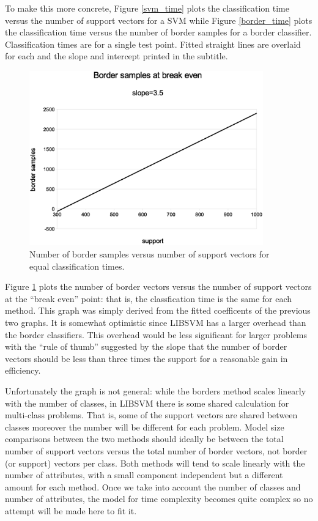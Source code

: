 To make this more concrete, Figure \ref{svm_time}
plots the classification time versus the number of support vectors
for a SVM
while Figure \ref{border_time} plots the classification time
versus the number of border samples for a border classifier.
Classification times are for a single test point.
Fitted straight lines are overlaid for each and the slope and intercept 
printed in the subtitle.

\begin{figure}
\includegraphics[width=0.9\textwidth]{../break_even}
\caption{Number of border samples versus number of support vectors for equal classification times.}
\label{break_even}
\end{figure}

Figure \ref{break_even} plots the number of border vectors versus the number
of support vectors at the ``break even'' point: that is, the classfication
time is the same for each method.
This graph was simply derived from the fitted coefficents of the previous
two graphs.
It is somewhat optimistic
since LIBSVM has a larger overhead than the border classifiers.
This overhead would be less significant for larger problems 
with the ``rule of thumb'' suggested by the slope 
that the number of border vectors should be less than three times the support
for a reasonable gain in efficiency.

Unfortunately the graph is not general: while the borders method scales linearly with
the number of classes, in LIBSVM there is some shared calculation for multi-class problems.
That is, some of the support vectors are shared between classes moreover the number will be different for each problem.
Model size comparisons between the two methods should ideally be between the total 
number of support vectors versus the total number of border vectors, not border (or support) vectors per class.
Both methods will tend to scale linearly with the number of attributes, with a small
component independent but a different amount for each method.
Once we take into account the number of classes and number of attributes, the
model for time complexity becomes quite complex so no attempt will be made here
to fit it.

